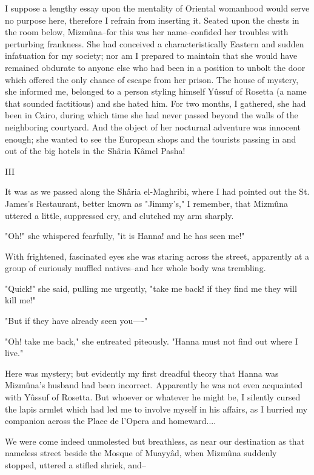 I suppose a lengthy essay upon the mentality of Oriental womanhood
would serve no purpose here, therefore I refrain from inserting it.
Seated upon the chests in the room below, Mizmûna--for this was her
name--confided her troubles with perturbing frankness. She had
conceived a characteristically Eastern and sudden infatuation for my
society; nor am I prepared to maintain that she would have remained
obdurate to anyone else who had been in a position to unbolt the door
which offered the only chance of escape from her prison. The house of
mystery, she informed me, belonged to a person styling himself Yûssuf
of Rosetta (a name that sounded factitious) and she hated him. For two
months, I gathered, she had been in Cairo, during which time she had
never passed beyond the walls of the neighboring courtyard. And the
object of her nocturnal adventure was innocent enough; she wanted to
see the European shops and the tourists passing in and out of the big
hotels in the Shâria Kâmel Pasha!


III

It was as we passed along the Shâria el-Maghribi, where I had pointed
out the St. James's Restaurant, better known as "Jimmy's," I remember,
that Mizmûna uttered a little, suppressed cry, and clutched my arm
sharply.

"Oh!" she whispered fearfully, "it is Hanna! and he has seen me!"

With frightened, fascinated eyes she was staring across the street,
apparently at a group of curiously muffled natives--and her whole body
was trembling.

"Quick!" she said, pulling me urgently, "take me back! if they find me
they will kill me!"

"But if they have already seen you----"

"Oh! take me back," she entreated piteously. "Hanna must not find out
where I live."

Here was mystery; but evidently my first dreadful theory that Hanna
was Mizmûna's husband had been incorrect. Apparently he was not even
acquainted with Yûssuf of Rosetta. But whoever or whatever he might
be, I silently cursed the lapis armlet which had led me to involve
myself in his affairs, as I hurried my companion across the Place de
l'Opera and homeward....

We were come indeed unmolested but breathless, as near our destination
as that nameless street beside the Mosque of Muayyâd, when Mizmûna
suddenly stopped, uttered a stifled shriek, and--

